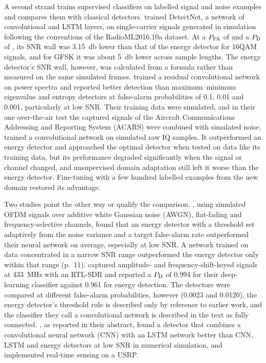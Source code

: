A second strand trains supervised classifiers on labelled signal and noise examples and compares them with classical detectors. \Textcite{gao2019} trained DetectNet, a network of convolutional and LSTM layers, on single-carrier signals generated in simulation following the conventions of the RadioML2016.10a dataset. At a $P_{\mathrm{FA}}$ of  and a $P_{\mathrm{D}}$ of , its SNR wall was \qty{3.15}{\decibel} lower than that of the energy detector for 16QAM signals, and for GFSK it was about \qty{5}{\decibel} lower across sample lengths. The energy detector's SNR wall, however, was calculated from a formula rather than measured on the same simulated frames. \Textcite{zheng2020} trained a residual convolutional network on power spectra and reported better detection than maximum--minimum eigenvalue and entropy detectors at false-alarm probabilities of 0.1, 0.01 and 0.001, particularly at low SNR. Their training data were simulated, and in their one over-the-air test the captured signals of the Aircraft Communications Addressing and Reporting System (ACARS) were combined with simulated noise. \Textcite{peng2020} trained a convolutional network on simulated raw IQ samples. It outperformed an energy detector and approached the optimal detector when tested on data like its training data, but its performance degraded significantly when the signal or channel changed, and unsupervised domain adaptation still left it worse than the energy detector. Fine-tuning with a few hundred labelled examples from the new domain restored its advantage.

Two studies point the other way or qualify the comparison. \Textcite{grosu2021}, using simulated OFDM signals over additive white Gaussian noise (AWGN), flat-fading and frequency-selective channels, found that an energy detector with a threshold set adaptively from the noise variance and a target false-alarm rate outperformed their neural network on average, especially at low SNR. A network trained on data concentrated in a narrow SNR range outperformed the energy detector only within that range (p.~11). \Textcite{saber2021} captured amplitude- and frequency-shift-keyed signals at \qty{433}{\mega\hertz} with an RTL-SDR and reported a $P_{\mathrm{D}}$ of 0.994 for their deep-learning classifier against 0.961 for energy detection. The detectors were compared at different false-alarm probabilities, however (0.0023 and 0.0120), the energy detector's threshold rule is described only by reference to earlier work, and the classifier they call a convolutional network is described in the text as fully connected. \Textcite{zeghdoud2023}, as reported in their abstract, found a detector that combines a convolutional neural network (CNN) with an LSTM network better than CNN, LSTM and energy detectors at low SNR in numerical simulation, and implemented real-time sensing on a USRP.

